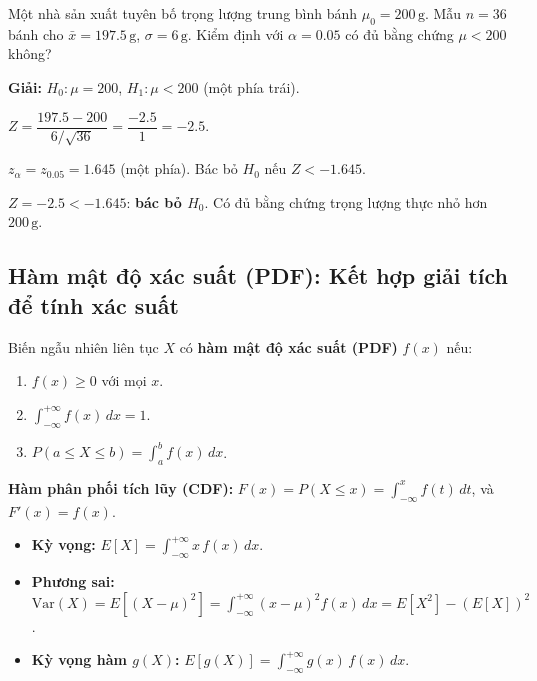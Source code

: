 \documentclass[12pt,a4paper]{article}
\begin{document}
\begin{vidu}
  Một nhà sản xuất tuyên bố trọng lượng trung bình bánh $\mu_0 = 200\,\text{g}$. Mẫu $n=36$ bánh cho $\bar{x} = 197.5\,\text{g}$, $\sigma = 6\,\text{g}$. Kiểm định với $\alpha = 0.05$ có đủ bằng chứng $\mu < 200$ không?

  \medskip\textbf{Giải:}
  $H_0: \mu = 200$, $H_1: \mu < 200$ (một phía trái).

  $Z = \dfrac{197.5 - 200}{6/\sqrt{36}} = \dfrac{-2.5}{1} = -2.5$.

  $z_\alpha = z_{0.05} = 1.645$ (một phía). Bác bỏ $H_0$ nếu $Z < -1.645$.

  $Z = -2.5 < -1.645$: \textbf{bác bỏ $H_0$}. Có đủ bằng chứng trọng lượng thực nhỏ hơn $200\,\text{g}$.
\end{vidu}

\subsection{Hàm mật độ xác suất (PDF): Kết hợp giải tích để tính xác suất}

\begin{dinhnghia}[title={Biến ngẫu nhiên liên tục và PDF}]
  Biến ngẫu nhiên liên tục $X$ có \textbf{hàm mật độ xác suất (PDF)} $f(x)$ nếu:
  \begin{enumerate}
    \item $f(x) \ge 0$ với mọi $x$.
    \item $\displaystyle\int_{-\infty}^{+\infty} f(x)\,dx = 1$.
    \item $P(a \le X \le b) = \displaystyle\int_a^b f(x)\,dx$.
  \end{enumerate}
  \textbf{Hàm phân phối tích lũy (CDF):} $F(x) = P(X \le x) = \displaystyle\int_{-\infty}^x f(t)\,dt$, và $F'(x) = f(x)$.
\end{dinhnghia}

\begin{congthuc}[title={Kỳ vọng và phương sai của biến liên tục}]
  \begin{itemize}
    \item \textbf{Kỳ vọng:} $E[X] = \displaystyle\int_{-\infty}^{+\infty} x\,f(x)\,dx$.
    \item \textbf{Phương sai:} $\text{Var}(X) = E[(X-\mu)^2] = \displaystyle\int_{-\infty}^{+\infty} (x-\mu)^2 f(x)\,dx = E[X^2] - (E[X])^2$.
    \item \textbf{Kỳ vọng hàm $g(X)$:} $E[g(X)] = \displaystyle\int_{-\infty}^{+\infty} g(x)\,f(x)\,dx$.
  \end{itemize}
\end{congthuc}
\end{document}

